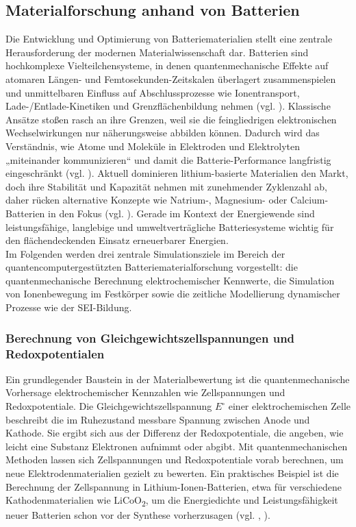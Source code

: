 \subsection{Materialforschung anhand von Batterien}
\label{Chemie_Materialforschung_Batterien}

Die Entwicklung und Optimierung von Batteriematerialien stellt eine zentrale Herausforderung der modernen Materialwissenschaft dar. Batterien sind hochkomplexe Vielteilchensysteme, in denen quantenmechanische Effekte auf atomaren Längen- und Femtosekunden-Zeitskalen überlagert zusammenspielen und unmittelbaren Einfluss auf Abschlussprozesse wie Ionentransport, Lade-/Entlade-Kinetiken und Grenzflächenbildung nehmen (vgl. \cite{bauer_quantum_2020}). Klassische Ansätze stoßen rasch an ihre Grenzen, weil sie die feingliedrigen elektronischen Wechselwirkungen nur näherungsweise abbilden können. Dadurch wird das Verständnis, wie Atome und Moleküle in Elektroden und Elektrolyten „miteinander kommunizieren“ und damit die Batterie-Performance langfristig eingeschränkt (vgl. \cite{demirApplicationQuantumComputing2024}).
Aktuell dominieren lithium-basierte Materialien den Markt, doch ihre Stabilität und Kapazität nehmen mit zunehmender Zyklenzahl ab, daher rücken alternative Konzepte wie Natrium-, Magnesium- oder Calcium-Batterien in den Fokus (vgl. \cite{demirApplicationQuantumComputing2024}). Gerade im Kontext der Energiewende sind leistungsfähige, langlebige und umweltverträgliche Batteriesysteme wichtig für den flächendeckenden Einsatz erneuerbarer Energien. 
\newline\\
Im Folgenden werden drei zentrale Simulationsziele im Bereich der quantencomputergestützten Batteriematerialforschung vorgestellt: die quantenmechanische Berechnung elektrochemischer Kennwerte, die Simulation von Ionenbewegung im Festkörper sowie die zeitliche Modellierung dynamischer Prozesse wie der SEI-Bildung.

\subsubsection{Berechnung von Gleichgewichtszellspannungen und Redoxpotentialen}

Ein grundlegender Baustein in der Materialbewertung ist die quantenmechanische Vorhersage elektrochemischer Kennzahlen wie Zellspannungen und Redoxpotentiale. Die Gleichgewichtszellspannung $E^\circ$
einer elektrochemischen Zelle beschreibt die im Ruhezustand messbare Spannung zwischen Anode und Kathode. Sie ergibt sich aus der Differenz der Redoxpotentiale, die angeben, wie leicht eine Substanz Elektronen aufnimmt oder abgibt. Mit quantenmechanischen Methoden lassen sich Zellspannungen und Redoxpotentiale vorab berechnen, um neue Elektrodenmaterialien gezielt zu bewerten. Ein praktisches Beispiel ist die Berechnung der Zellspannung in Lithium-Ionen-Batterien, etwa für verschiedene Kathodenmaterialien wie LiCoO\textsubscript{2}, um die Energiedichte und Leistungsfähigkeit neuer Batterien schon vor der Synthese vorherzusagen (vgl. \cite{urban_computational_2016}, \cite{hanaor_computational_2024}).

